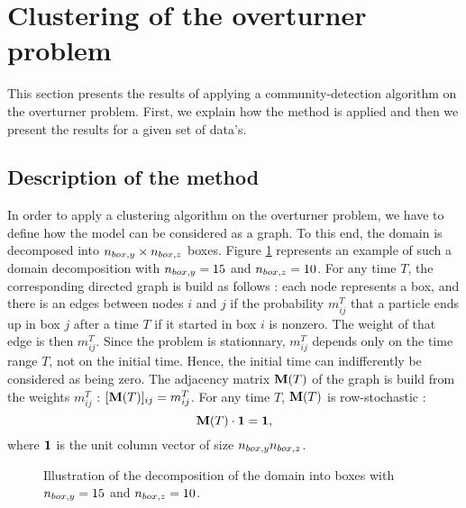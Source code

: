 \section{Clustering of the overturner problem}

This section presents the results of applying a community-detection algorithm on the overturner problem. First, we explain how the method is applied and then we present the results for a given set of data's.

\subsection{Description of the method}
In order to apply a clustering algorithm on the overturner problem, we have to define how the model can be considered as a graph. To this end, the domain is decomposed into $n_{box,y} \times n_{box,z}$ boxes. Figure \ref{fig:box_scheme} represents an example of such a domain decomposition with $n_{box,y} = 15$ and $n_{box,z} = 10$. For any time $T$, the corresponding directed graph is build as follows : each node represents a box, and there is an edges between nodes $i$ and $j$ if the probability $m^T_{ij}$ that a particle ends up in box $j$ after a time $T$ if it started in box $i$ is nonzero. The weight of that edge is then $m^T_{ij}$. Since the problem is stationnary, $m^T_{ij}$ depends only on the time range $T$, not on the initial time. Hence, the initial time can indifferently be considered as being zero. The adjacency matrix $\mathbf M(T)$ of the graph is build from the weights $m^T_{ij}$ : $[\mathbf M(T)]_{ij} = m^T_{ij}$. For any time $T$, $\mathbf M(T)$ is row-stochastic :
\begin{equation}
	\mathbf M(T) \cdot \mathbf 1 = \mathbf 1,
\end{equation}
where $\mathbf 1$ is the unit column vector of size $n_{box,y}n_{box,z}$.
\begin{figure}[h!]
	\centering
	
	\caption{Illustration of the decomposition of the domain into boxes with $n_{box,y} = 15$ and $n_{box,z} = 10$.}
	\label{fig:box_scheme}
\end{figure}

